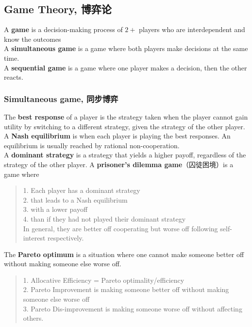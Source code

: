 \subsection{Game Theory, 博弈论}
A \textbf{game} is a decision-making process of $2+$ players who are interdependent and know the outcomes \\
A \textbf{simultaneous game} is a game where both players make decisions at the same time. \\
A \textbf{sequential game} is a game where one player makes a decision, then the other reacts. \\
\subsubsection{Simultaneous game, 同步博弈}
The \textbf{best response} of a player is the strategy taken when the player cannot gain utility by switching to a different strategy, given the strategy of the other player. \\
A \textbf{Nash equilibrium} is when each player is playing the best responses. An equilibrium is usually reached by rational non-cooperation. \\
A \textbf{dominant strategy} is a strategy that yields a higher payoff, regardless of the strategy of the other player.
A \textbf{prisoner's dilemma game}（囚徒困境）is a game where
\begin{quote}
    1. Each player has a dominant strategy \\
    2. that leads to a Nash equilibrium \\
    3. with a lower payoff \\
    4. than if they had not played their dominant strategy \\
    In general, they are better off cooperating but worse off following self-interest respectively.
\end{quote}
The \textbf{Pareto optimum} is a situation where one cannot make someone better off without making someone else worse off.
\begin{quote}
    1. Allocative Efficiency = Pareto optimality/efficiency \\
    2. Pareto Improvement is making someone better off without making someone else worse off \\
    3. Pareto Dis-improvement is making someone worse off without affecting others.
\end{quote}
